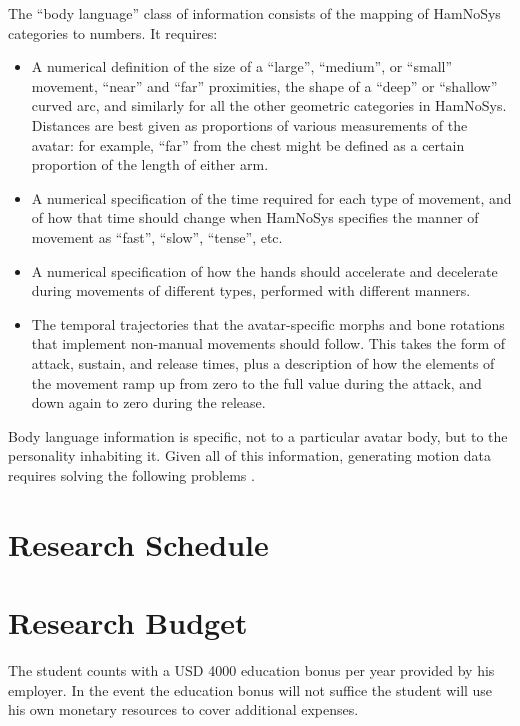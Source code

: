 The “body language” class of information consists of the mapping of HamNoSys categories to numbers. It requires:
\begin{itemize}
\item A numerical definition of the size of a “large”, “medium”, or “small” movement, “near” and “far” proximities, the shape of a “deep” or “shallow” curved arc, and similarly for all the other geometric categories in HamNoSys. Distances are best given as proportions of various measurements of the avatar: for example, “far” from the chest might be defined as a certain proportion of the length of either arm.
\item A numerical specification of the time required for each type of movement, and of how that time should change when HamNoSys specifies the manner of movement as “fast”, “slow”, “tense”, etc.
\item A numerical specification of how the hands should accelerate and decelerate during movements of different types, performed with different manners.
\item The temporal trajectories that the avatar-specific morphs and bone rotations that implement non-manual movements should follow. This takes the form of attack, sustain, and release times, plus a description of how the elements of the movement ramp up from zero to the full value during the attack, and down again to zero during the release.
\end{itemize}

Body language information is specific, not to a particular avatar body, but to the personality inhabiting it. Given all of this information, generating motion data requires solving the following problems \cite{kennaway2015avatar}.

\section{Research Schedule}\label{research-schedule}


\section{Research Budget}\label{research-budget}
The student counts with a USD 4000 education bonus per year provided by his employer. In the event the education bonus will not suffice the student will use his own monetary resources to cover additional expenses.


